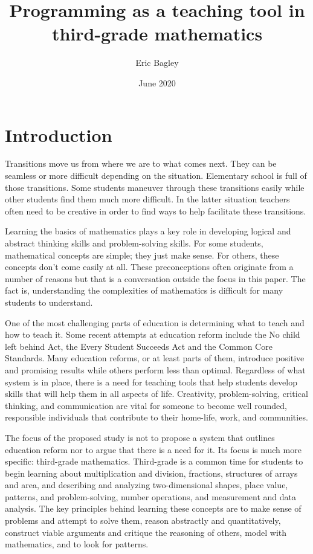 \documentclass[12pt]{extarticle}
\title{Programming as a teaching tool in third-grade mathematics }
\author{Eric Bagley}
\date{June 2020}
\begin{document}
\maketitle

\section*{Introduction}

Transitions move us from where we are to what comes next.
They can be seamless or more difficult depending on the situation.
Elementary school is full of those transitions.
Some students maneuver through these transitions easily while other students find them much more difficult. 
In the latter situation teachers often need to be creative in order to find ways to help facilitate these transitions.

Learning the basics of mathematics plays a key role in developing logical and abstract thinking skills and problem-solving skills.
For some students, mathematical concepts are simple; they just make sense.
For others, these concepts don’t come easily at all.
These preconceptions often originate from a number of reasons but that is a conversation outside the focus in this paper.
The fact is, understanding the complexities of mathematics is difficult for many students to understand.

One of the most challenging parts of education is determining what to teach and how to teach it.
Some recent attempts at education reform include the No child left behind Act,  the Every Student Succeeds Act and the Common Core Standards.
Many education reforms, or at least parts of them, introduce positive and promising results while others perform less than optimal.
Regardless of what system is in place, there is a need for teaching tools that help students develop skills that will help them in all aspects of life.
Creativity, problem-solving, critical thinking, and communication are vital for someone to become well rounded, responsible individuals that contribute to their home-life, work, and communities.

The focus of the proposed study is not to propose a system that outlines education reform nor to argue that there is a need for it.
Its focus is much more specific: third-grade mathematics.
Third-grade is a common time for students to begin learning about multiplication and division, fractions, structures of arrays and area, and describing and analyzing two-dimensional shapes, place value, patterns, and problem-solving, number operations, and measurement and data analysis.
The key principles behind learning these concepts are to make sense of problems and attempt to solve them, reason abstractly and quantitatively, construct viable arguments and critique the reasoning of others, model with mathematics, and to look for patterns.
\end{document}
